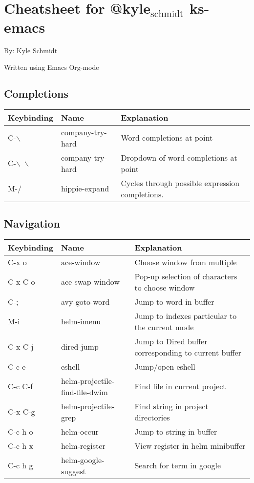 \documentclass[11pt]{article}
\author{Kyle Schmidt}
\date{\today}
\title{}
\begin{document}
\tableofcontents

\section{Cheatsheet for @kyle\(_{\text{schmidt}}\) ks-emacs}
\label{sec:orgheadline7}
By: Kyle Schmidt

Written using Emacs Org-mode

\subsection{Completions}
\label{sec:orgheadline1}

\begin{center}
\begin{tabular}{lll}
Keybinding & Name & Explanation\\
\hline
C-$\backslash$\ & company-try-hard & Word completions at point\\
C-$\backslash$\ $\backslash$\ & company-try-hard & Dropdown of word completions at point\\
M-/ & hippie-expand & Cycles through possible expression completions.\\
\end{tabular}
\end{center}

\subsection{Navigation}
\label{sec:orgheadline2}

\begin{center}
\begin{tabular}{lll}
Keybinding & Name & Explanation\\
\hline
C-x o & ace-window & Choose window from multiple\\
C-x C-o & ace-swap-window & Pop-up selection of characters to choose window\\
C-; & avy-goto-word & Jump to word in buffer\\
M-i & helm-imenu & Jump to indexes particular to the current mode\\
C-x C-j & dired-jump & Jump to Dired buffer corresponding to current buffer\\
C-c e & eshell & Jump/open eshell\\
C-c C-f & helm-projectile-find-file-dwim & Find file in current project\\
C-x C-g & helm-projectile-grep & Find string in project directories\\
C-c h o & helm-occur & Jump to string in buffer\\
C-c h x & helm-register & View register in helm minibuffer\\
C-c h g & helm-google-suggest & Search for term in google\\
\end{tabular}
\end{center}
\end{document}
